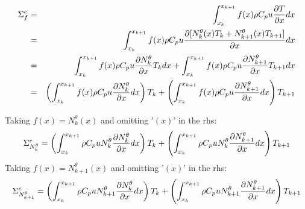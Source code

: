 \begin{eqnarray}
{\Sigma}_f^e 
&=&\int_{x_k}^{x_{k+1}} f(x) \rho C_p u\frac{\partial T}{\partial x} dx \nonumber\\
&=&\int_{x_k}^{x_{k+1}} f(x) \rho C_p u\frac{\partial [ N_{k}^\theta(x) {T}_k + N_{k+1}^\theta(x) {T}_{k+1} ] }{\partial x} dx \nonumber\\
&=&\int_{x_k}^{x_{k+1}} f(x) \rho C_p u\frac{\partial  N_{k}^\theta }{\partial x} T_k dx 
+  \int_{x_k}^{x_{k+1}} f(x) \rho C_p u\frac{\partial  N_{k+1}^\theta }{\partial x} T_{k+1} dx \nonumber\\
&=& \left(  \int_{x_k}^{x_{k+1}} f(x) \rho C_p u\frac{\partial  N_{k}^\theta }{\partial x} dx \right) T_k 
+ \left( \int_{x_k}^{x_{k+1}} f(x) \rho C_p u\frac{\partial  N_{k+1}^\theta }{\partial x} dx \right)T_{k+1}  \nonumber
\end{eqnarray}

Taking $f(x)=N_k^\theta(x)$ and omitting '$(x)$' in the rhs:
\[
{\Sigma}_{N_k^\theta}^e=
\left( \int_{x_k}^{x_{k+1}} \rho C_p u N_k^\theta \frac{\partial  N_{k}^\theta }{\partial x} dx \right) T_k 
+ 
\left( \int_{x_k}^{x_{k+1}} \rho C_p u N_k^\theta \frac{\partial  N_{k+1}^\theta }{\partial x} dx \right)T_{k+1}  \nonumber
\]
Taking $f(x)=N_{k+1}^\theta(x)$ and omitting '$(x)$' in the rhs:
\[
{\Sigma}_{N_{k+1}^\theta}^e=
\left( \int_{x_k}^{x_{k+1}} \rho C_p u N_{k+1}^\theta \frac{\partial  N_{k}^\theta }{\partial x} dx \right) T_k + 
\left( \int_{x_k}^{x_{k+1}} \rho C_p u N_{k+1}^\theta \frac{\partial  N_{k+1}^\theta }{\partial x} dx \right)T_{k+1}  \nonumber
\]




